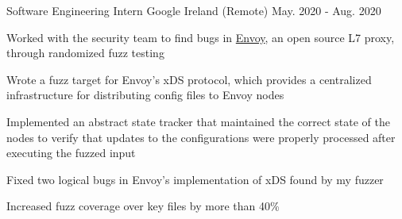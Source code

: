 \begin{cventries}
  \cventry
    {Software Engineering Intern} %
    {Google} %
    {Ireland (Remote)} %
    {May. 2020 - Aug. 2020} %
    {
      \begin{cvitems} %
      \item Worked with the security team to find bugs in \href{https://github.com/envoyproxy/envoy}{Envoy}, an open source L7 proxy, through randomized fuzz testing
        \item Wrote a fuzz target for Envoy's xDS protocol, which provides a centralized infrastructure for distributing config files to Envoy nodes
        \item Implemented an abstract state tracker that maintained the correct state of the nodes to verify that updates to the configurations were properly processed after executing the fuzzed input
        \item Fixed two logical bugs in Envoy's implementation of xDS found by my fuzzer
        \item Increased fuzz coverage over key files by more than 40\%
      \end{cvitems}
    }

\end{cventries}
